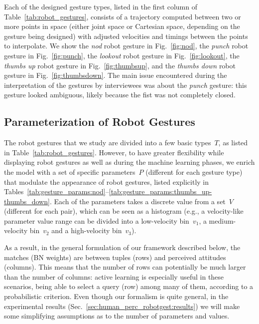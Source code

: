 Each of the designed gesture types, listed in the first column of Table~\ref{tab:robot_gestures}, consists of a trajectory computed between two or more points in space (either joint space or Cartesian space, depending on the gesture being designed) with adjusted velocities and timings between the points to interpolate.
We show
the \emph{nod} robot gesture in Fig.~\ref{fig:nod},
the \emph{punch} robot gesture in Fig.~\ref{fig:punch},
the \emph{lookout} robot gesture in Fig.~\ref{fig:lookout},
the \emph{thumbs up} robot gesture in Fig.~\ref{fig:thumbsup}, and
the \emph{thumbs down} robot gesture in Fig.~\ref{fig:thumbsdown}.
The main issue encountered during the interpretation of the gestures by interviewees was about the \emph{punch} gesture: this gesture looked ambiguous, likely because the fist was not completely closed.

\subsection{Parameterization of Robot Gestures}
\label{sec:parameterization}

The robot gestures that we study are divided into a few basic types~$T$, as listed in Table~\ref{tab:robot_gestures}. However, to have greater flexibility while displaying robot gestures as well as during the machine learning phases, we enrich the model with a set of specific parameters~$P$ (different for each gesture type) that modulate the appearance of robot gestures, listed explicitly in Tables~\ref{tab:gesture_params:nod}--\ref{tab:gesture_params:thumbs_up-thumbs_down}. Each of the parameters takes a discrete value from a set~$V$ (different for each \gestpar{} pair), which can be seen as a histogram (e.g., a velocity-like parameter value range can be divided into a low-velocity bin~$v_1$, a medium-velocity bin~$v_2$ and a high-velocity bin~$v_3$).

As a result, in the general formulation of our framework described below, the matches (\acl{BN} weights) are between \gestparval{} tuples (rows) and perceived attitudes (columns). This means that the number of rows can potentially be much larger than the number of columns: active learning is especially useful in these scenarios, being able to select a query (row) among many of them, according to a probabilistic criterion. Even though our formalism is quite general, in the experimental results (Sec.~\ref{sec:human_perc_robotgest:results}) we will make some simplifying assumptions as to the number of parameters and values.

